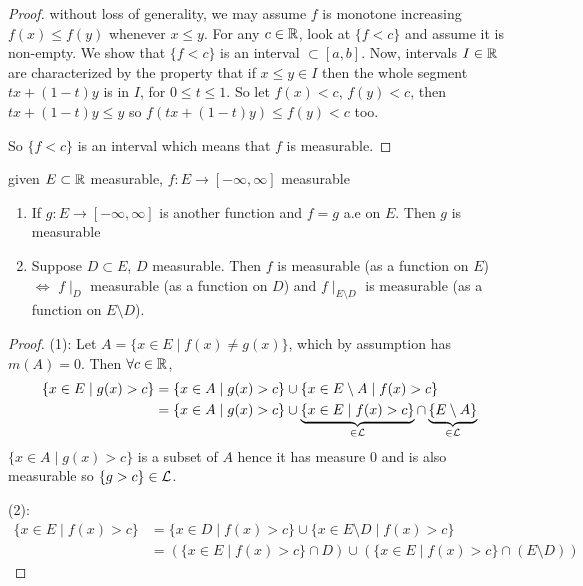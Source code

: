 \begin{proof}
    without loss of generality, we may assume $f$ is monotone increasing $f(x) \leq f(y)$ whenever $x \leq y$.
    For any $c \in \mathbb{R}$, look at $\{ f < c \}$ and assume it is non-empty.
    We show that $\{ f < c \}$ is an interval $\subset [a,b]$.
    Now, intervals $I \in \mathbb{R}$ are characterized by the property that if $x \leq y \in I$ then the whole segment $tx + (1-t)y$ is in $I$, for $0 \leq t \leq 1$.
    So let $f(x) < c$, $f(y) < c$, then $tx + (1-t)y \leq y$ so $f(tx + (1-t)y) \leq f(y) < c$ too.

    So $\{ f < c\}$ is an interval which means that $f$ is measurable.
\end{proof}

\begin{prop}
    given $E \subset \mathbb{R}$ measurable, $f: E \rightarrow [-\infty, \infty]$ measurable
    \begin{enumerate}
        \item If $g: E \rightarrow [-\infty, \infty]$ is another function and $f=g$ a.e on $E$.
        Then $g$ is measurable
        \item Suppose $D \subset E$, $D$ measurable.
        Then $f$ is measurable (as a function on $E$) $\iff$ $f\mid_{D}$ measurable (as a function on $D$) and $f \mid_{E \setminus D}$ is measurable (as a function on $E \setminus D$).
    \end{enumerate}
\end{prop}

\begin{proof}
(1): Let $A = \{ x \in E \mid f(x) \ne g(x) \}$, which by assumption has $m(A) = 0$.
    Then $\forall c \in \mathbb{R}$,
    \begin{align*}
        \{ x \in E \mid g(x) > c \} &= \{ x \in A \mid g(x) > c \} \cup \{ x \in E \setminus A \mid f(x) > c \} \\
        &= \{ x \in A \mid g(x) > c \} \cup \underbrace{\{ x \in E\mid f(x) > c \}}_{\in \mathcal{L}} \cap \underbrace{\{ E \setminus A \}}_{\in \mathcal{L}}
    \end{align*}
    $\{ x \in A \mid g(x) > c \}$ is a subset of $A$ hence it has measure 0 and is also measurable so $\{ g > c \} \in \mathcal{L}$.

(2): \begin{align*}
         \{ x \in E \mid f(x) > c \} &= \{ x \in D \mid f(x) > c \} \cup \{ x \in E \setminus D \mid f(x) > c \} \\
         &= ( \{ x \in E \mid f(x) > c \} \cap D) \cup (\{ x \in E \mid f(x) > c \} \cap (E \setminus D))
\end{align*}
\end{proof}

